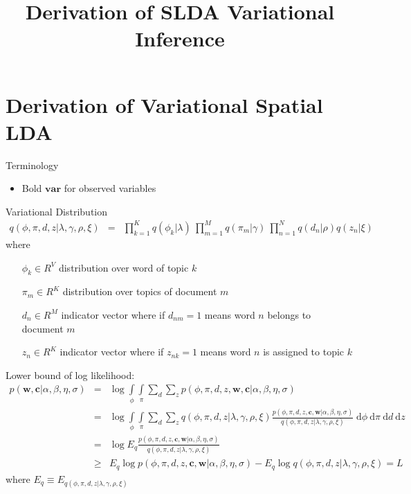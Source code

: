 \documentclass[]{article}
\title{Derivation of SLDA Variational Inference}
\author{}
\begin{document}
\maketitle

\section*{Derivation of Variational Spatial LDA}

Terminology
\begin{itemize}
	\item Bold $\boldsymbol{var}$ for observed variables
\end{itemize}

Variational Distribution
\begin{eqnarray}
q(\phi,\pi,d,z | \lambda,\gamma,\rho,\xi) &=& \prod\limits_{k=1}^{K}q(\phi_k|\lambda) \: \prod\limits_{m=1}^{M}q(\pi_m|\gamma) \: \prod\limits_{n=1}^{N}q(d_n | \rho) q(z_n | \xi)
\end{eqnarray}
where 
\begin{itemize}
	\item[$\phi_k \in R^V$] distribution over word of topic $k$
	\item[$\pi_m \in R^K$] distribution over topics of document $m$
	\item[$d_n \in R^M$] indicator vector where if $d_{nm} = 1$ means word $n$ belongs to document $m$
	\item[$z_n \in R^K$] indicator vector where if $z_{nk} = 1$ means word $n$ is assigned to topic $k$
\end{itemize}

Lower bound of log likelihood:
\begin{eqnarray}
p(\boldsymbol{w}, \boldsymbol{c} | \alpha,\beta,\eta,\sigma) 
&=& \log \int\limits_{\phi} \int\limits_{\pi} \sum\limits_{d} \sum\limits_{z} p(\phi,\pi,d,z,\boldsymbol{w},\boldsymbol{c} | \alpha,\beta,\eta,\sigma) \\
&=&  \log \int\limits_{\phi} \int\limits_{\pi} \sum\limits_{d} \sum\limits_{z} q(\phi,\pi,d,z | \lambda,\gamma,\rho,\xi) \frac{p(\phi,\pi,d,z,\boldsymbol{c},\boldsymbol{w} | \alpha,\beta,\eta,\sigma)}{q(\phi,\pi,d,z | \lambda,\gamma,\rho,\xi)} \; \mathrm{d}\phi \: \mathrm{d}\pi \: \mathrm{d}d \: \mathrm{d}z\\
&=& \log E_q \frac{p(\phi,\pi,d,z,\boldsymbol{c},\boldsymbol{w} | \alpha,\beta,\eta,\sigma)}{q(\phi,\pi,d,z | \lambda,\gamma,\rho,\xi)} \\
&\ge& E_q \log p(\phi,\pi,d,z,\boldsymbol{c},\boldsymbol{w} | \alpha,\beta,\eta,\sigma) - E_q \log q(\phi,\pi,d,z | \lambda,\gamma,\rho,\xi) = L
\end{eqnarray}
where $E_q \equiv E_{q(\phi,\pi,d,z | \lambda,\gamma,\rho,\xi)}$
\end{document}
